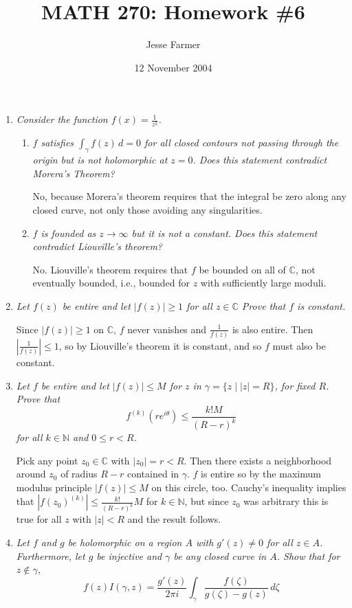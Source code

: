 \documentclass[letterpaper, 11pt]{article}
\title{MATH 270: Homework \#6}
\author{Jesse Farmer}
\date{12 November 2004}
\newcommand{\C}{\mathbb{C}}
\newcommand{\N}{\mathbb{N}}
\begin{document}
\maketitle
\begin{enumerate}

\item \emph{Consider the function $f(x) = \frac{1}{z^2}$.}
\begin{enumerate}
\item \emph{$f$ satisfies $\int_{\gamma} f(z) \,d = 0$ for all closed contours not passing through the origin but is not holomorphic at $z=0$.  Does this statement contradict Morera's Theorem?}

No, because Morera's theorem requires that the integral be zero along any closed curve, not only those avoiding any singularities.

\item \emph{$f$ is founded as $z \rightarrow \infty$ but it is not a constant.  Does this statement contradict Liouville's theorem?}

No.  Liouville's theorem requires that $f$ be bounded on all of $\C$, not eventually bounded, i.e., bounded for $z$ with sufficiently large moduli.

\end{enumerate}

\item \emph{Let $f(z)$ be entire and let $|f(z)| \geq 1$ for all $z \in \C$  Prove that $f$ is constant.}

Since $|f(z)| \geq 1$ on $\C$, $f$ never vanishes and $\frac{1}{f(z)}$ is also entire.  Then $\left|\frac{1}{f(z)}\right| \leq 1$, so by Liouville's theorem it is constant, and so $f$ must also be constant.

\item \emph{Let $f$ be entire and let $|f(z)| \leq M$ for $z$ in $\gamma=\{z \mid |z| = R\}$, for fixed $R$.  Prove that $$f^{(k)}(re^{i\theta}) \leq \frac{k!M}{(R-r)^k}$$ for all $k \in \N$ and $0 \leq r < R$.}

Pick any point $z_0 \in \C$ with $|z_0| = r < R$.  Then there exists a neighborhood around $z_0$ of radius $R - r$ contained in $\gamma$.  $f$ is entire so by the maximum modulus principle $|f(z)| \leq M$ on this circle, too.  Cauchy's inequality implies that $|f(z_0)^{(k)}| \leq \frac{k!}{(R-r)^k}M$ for $k \in \N$, but since $z_0$ was arbitrary this is true for all $z$ with $|z| < R$ and the result follows.

\item \emph{Let $f$ and $g$ be holomorphic on a region $A$ with $g'(z) \neq 0$ for all $z \in A$.  Furthermore, let $g$ be injective and $\gamma$ be any closed curve in $A$.  Show that for $z \notin \gamma$, $$f(z)I(\gamma,z) = \frac{g'(z)}{2\pi i}\int_{\gamma} \frac{f(\zeta)}{g(\zeta) - g(z)}\,d\zeta$$}


\end{enumerate}
\end{document}
